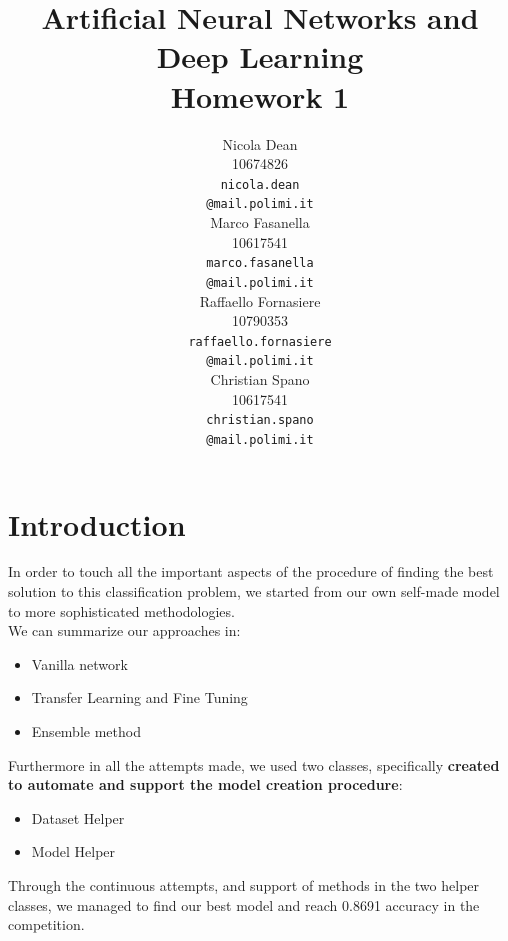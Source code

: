 \documentclass[10pt]{article}
\title{Artificial Neural Networks and Deep Learning \\
Homework 1}
\author{
  Nicola Dean \\
  10674826 \\
  {\tt nicola.dean \\
  \tt @mail.polimi.it} \\\And
  Marco Fasanella \\
  10617541 \\
  {\tt marco.fasanella \\
  \tt @mail.polimi.it} \\\And
  Raffaello Fornasiere \\
    10790353 \\
    {\tt raffaello.fornasiere \\
    \tt @mail.polimi.it} \\\And
  Christian Spano \\
  10617541 \\
  {\tt christian.spano \\
  \tt @mail.polimi.it} \\}
\date{}
\begin{document}
\maketitle



\section{Introduction}
In order to touch all the important aspects of the procedure of finding the best solution to this classification problem,
we started from our own self-made model to more sophisticated methodologies.\\
 We can summarize our approaches in:
\begin{itemize}
  \item Vanilla network
  \item Transfer Learning and Fine Tuning
  \item Ensemble method
\end{itemize}
Furthermore in all the attempts made, we used two classes, specifically \textbf{created to automate and support the model creation
procedure}:
\begin{itemize}
  \item Dataset Helper
  \item Model Helper
\end{itemize}
Through the continuous attempts, and support of methods in the two helper classes, we managed to find our best model and
reach 0.8691 accuracy in the competition.
\end{document}
